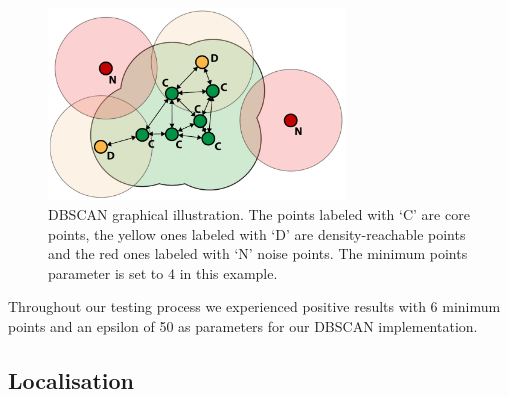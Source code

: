 \documentclass[lnicst,a4paper]{svmultln}
\begin{document}
\begin{figure}
 	\centerline{\includegraphics[width=0.7\textwidth]{dbscan1.pdf}}
	{\caption{DBSCAN graphical illustration.
	The points labeled with `C' are core points,
	the yellow ones labeled with `D' are density-reachable points
	and the red ones labeled with `N' noise points.
	The minimum points parameter is set to $4$ in this example.}\label{fig:dbscan1}}
\end{figure}

Throughout our testing process we experienced positive results with 6 minimum points and an epsilon of 50 as parameters for our DBSCAN implementation.





\subsection{Localisation}
\end{document}
